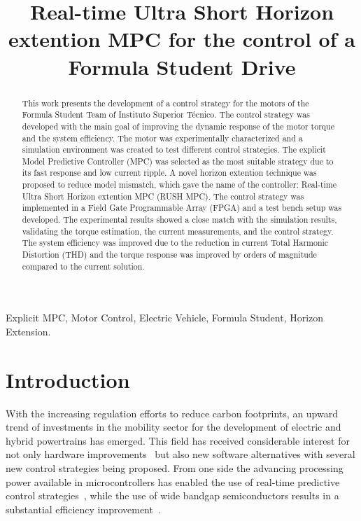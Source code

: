 \documentclass[9pt,conference]{IEEEtran}
\begin{document}
\title{Real-time Ultra Short Horizon extention MPC for the control of a Formula Student Drive\\}

\author{
}

\maketitle
\thispagestyle{plain}
\pagestyle{plain}
\begin{abstract}
	This work presents the development of a control strategy for the motors of the Formula Student Team of Instituto Superior Técnico. The control strategy was developed with the main goal of improving the dynamic response of the motor torque and the system efficiency. The motor was experimentally characterized and a simulation environment was created to test different control strategies. The explicit Model Predictive Controller (MPC) was selected as the most suitable strategy due to its fast response and low current ripple. A novel horizon extention technique was proposed to reduce model mismatch, which gave the name of the controller: Real-time Ultra Short Horizon extention MPC (RUSH MPC). The control strategy was implemented in a Field Gate Programmable Array (FPGA) and a test bench setup was developed. The experimental results showed a close match with the simulation results, validating the torque estimation, the current measurements, and the control strategy. The system efficiency was improved due to the reduction in current Total Harmonic Distortion (THD) and the torque response was improved by orders of magnitude compared to the current solution.
\end{abstract}

\begin{IEEEkeywords}
Explicit MPC, Motor Control, Electric Vehicle, Formula Student, Horizon Extension.
\end{IEEEkeywords}

\section{Introduction}
With the increasing regulation efforts to reduce carbon footprints, an upward trend of investments in the mobility sector for the development of electric and hybrid powertrains has emerged. This field has received considerable interest for not only hardware improvements~\cite{Wang:power_converter_review:2020} but also new software alternatives with several new control strategies being proposed. From one side the advancing processing power available in microcontrollers has enabled the use of real-time predictive control strategies~\cite{Karamanakos:MPC_in_power_electronics:2020}, while the use of wide bandgap semiconductors results in a substantial efficiency improvement~\cite{Palmour:wide_bandgap_efficiency:2006}.
\end{document}
